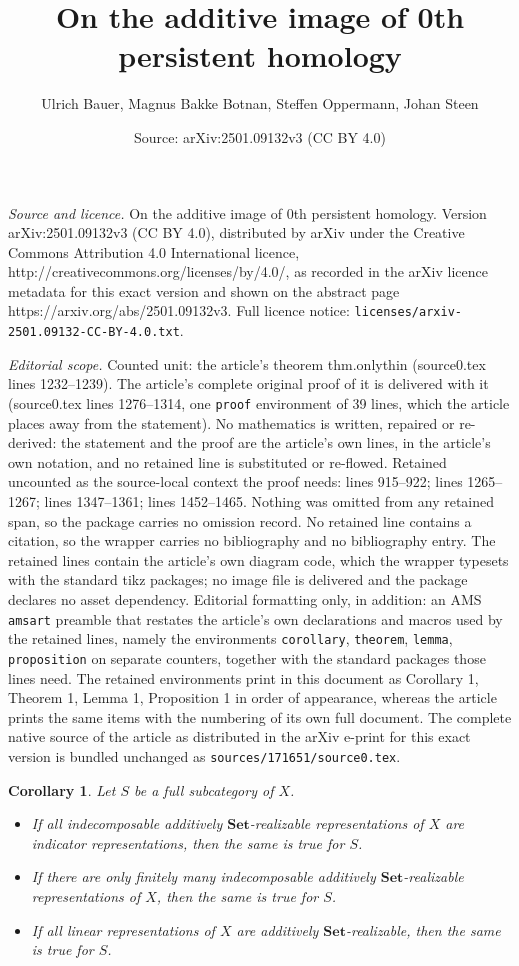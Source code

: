 \documentclass[10pt,a4paper]{amsart}
\title{On the additive image of 0th persistent homology}
\author{Ulrich Bauer, Magnus Bakke Botnan, Steffen Oppermann, Johan Steen}
\date{Source: arXiv:2501.09132v3 (CC BY 4.0)}
\newtheorem{corollary}{Corollary}
\newcommand{\Set}{\mathbf{Set}}
\begin{document}
\maketitle

\noindent\emph{Source and licence.} On the additive image of 0th persistent homology. Version arXiv:2501.09132v3 (CC BY 4.0), distributed by arXiv under the Creative Commons Attribution 4.0 International licence, http://creativecommons.org/licenses/by/4.0/, as recorded in the arXiv licence metadata for this exact version and shown on the abstract page https://arxiv.org/abs/2501.09132v3. Full licence notice: \texttt{licenses/arxiv-2501.09132-CC-BY-4.0.txt}.\par\smallskip

\noindent\textit{Editorial scope.} Counted unit: the article's theorem thm.onlythin (source0.tex lines 1232--1239). The article's complete original proof of it is delivered with it (source0.tex lines 1276--1314, one \texttt{proof} environment of 39 lines, which the article places away from the statement). No mathematics is written, repaired or re-derived: the statement and the proof are the article's own lines, in the article's own notation, and no retained line is substituted or re-flowed.  Retained uncounted as the source-local context the proof needs: lines 915--922; lines 1265--1267; lines 1347--1361; lines 1452--1465.  Nothing was omitted from any retained span, so the package carries no omission record.  No retained line contains a citation, so the wrapper carries no bibliography and no bibliography entry.  The retained lines contain the article's own diagram code, which the wrapper typesets with the standard tikz packages; no image file is delivered and the package declares no asset dependency.  Editorial formatting only, in addition: an AMS \texttt{amsart} preamble that restates the article's own declarations and macros used by the retained lines, namely the environments \texttt{corollary}, \texttt{theorem}, \texttt{lemma}, \texttt{proposition} on separate counters, together with the standard packages those lines need.  The retained environments print in this document as Corollary 1, Theorem 1, Lemma 1, Proposition 1 in order of appearance, whereas the article prints the same items with the numbering of its own full document.  The complete native source of the article as distributed in the arXiv e-print for this exact version is bundled unchanged as \texttt{sources/171651/source0.tex}.
\begin{corollary} \label{cor.subcategory}
Let \( S \) be a full subcategory of \( X \).
\begin{itemize}
\item If all indecomposable additively \( \Set \)-realizable representations of \( X \) are indicator representations, then the same is true for \( S \).
\item If there are only finitely many indecomposable additively \( \Set \)-realizable representations of \( X \), then the same is true for \( S \).
\item If all linear representations of \( X \) are additively \( \Set \)-realizable, then the same is true for \( S \).
\end{itemize}
\end{corollary}
\end{document}
